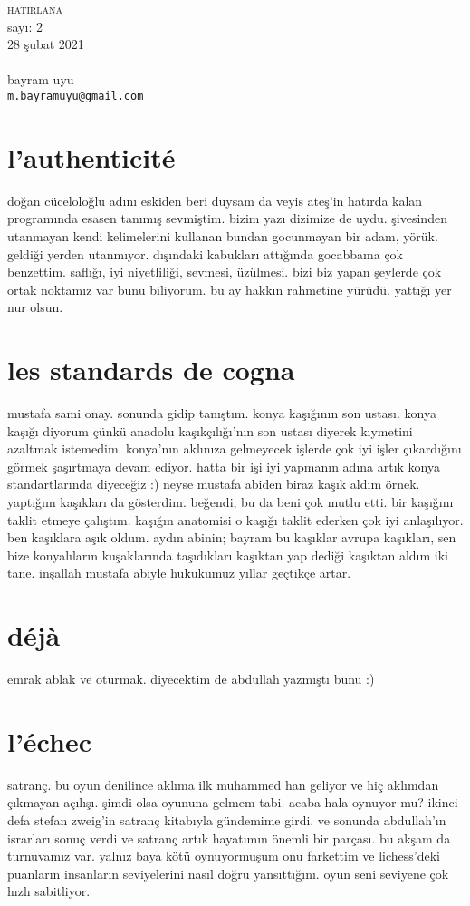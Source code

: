 \documentclass[a4paper, twocolumn, openright]{memoir}
\begin{document}
\thispagestyle{plain}
\noindent
{\HUGE\textsc{hatirlana}\\\small{}sayı: 2\\28 şubat 2021}\\\\
{bayram uyu\\\texttt{m.bayramuyu@gmail.com}}
\bigskip
\section{l'authenticité}
doğan cüceloloğlu adını eskiden beri duysam da veyis ateş’in hatırda
kalan programında esasen tanımış sevmiştim. bizim yazı dizimize de uydu.
şivesinden utanmayan kendi kelimelerini kullanan bundan gocunmayan bir
adam, yörük. geldiği yerden utanmıyor. dışındaki kabukları attığında
gocabbama çok benzettim. saflığı, iyi niyetliliği, sevmesi, üzülmesi.
bizi biz yapan şeylerde çok ortak noktamız var bunu biliyorum. bu ay
hakkın rahmetine yürüdü. yattığı yer nur olsun.
\section{les standards de cogna}
mustafa sami onay. sonunda gidip tanıştım. konya kaşığının son ustası.
konya kaşığı diyorum çünkü anadolu kaşıkçılığı’nın son ustası diyerek
kıymetini azaltmak istemedim. konya’nın aklınıza gelmeyecek işlerde çok
iyi işler çıkardığını görmek şaşırtmaya devam ediyor. hatta bir işi iyi
yapmanın adına artık konya standartlarında diyeceğiz :) neyse mustafa
abiden biraz kaşık aldım örnek. yaptığım kaşıkları da gösterdim. beğendi,
bu da beni çok mutlu etti. bir kaşığını taklit etmeye çalıştım. kaşığın
anatomisi o kaşığı taklit ederken çok iyi anlaşılıyor. ben kaşıklara aşık
oldum. aydın abinin; bayram bu kaşıklar avrupa kaşıkları, sen bize
konyalıların kuşaklarında taşıdıkları kaşıktan yap dediği kaşıktan aldım
iki tane. inşallah mustafa abiyle hukukumuz yıllar geçtikçe artar.
\section{déjà}
emrak ablak ve oturmak. diyecektim de abdullah yazmıştı bunu :)
\section{l'échec}
satranç. bu oyun denilince aklıma ilk muhammed han geliyor ve hiç
aklımdan çıkmayan açılışı. şimdi olsa oyununa gelmem tabi. acaba hala
oynuyor mu? ikinci defa stefan zweig’in satranç kitabıyla gündemime
girdi. ve sonunda abdullah’ın israrları sonuç verdi ve satranç artık
hayatımın önemli bir parçası. bu akşam da turnuvamız var. yalnız baya
kötü oynuyormuşum onu farkettim ve lichess’deki puanların insanların
seviyelerini nasıl doğru yansıttığını. oyun seni seviyene çok hızlı
sabitliyor.
\end{document}
